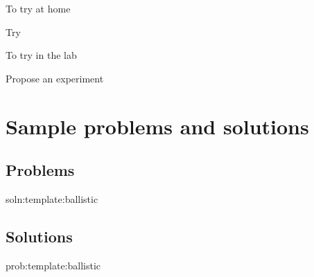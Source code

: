 \begin{chapteractivity}{To try at home}
{
\item Try
}
\end{chapteractivity}

\begin{chapteractivity}{To try in the lab}
{
\item Propose an experiment
}
\end{chapteractivity}

\newpage
\section{Sample problems and solutions}
\subsection{Problems}
\begin{problem}{soln:template:ballistic}{\label{prob:template:ballistic} 

}
\end{problem}

\newpage
\subsection{Solutions}
\begin{solution}{prob:template:ballistic}\label{soln:template:ballistic}

\end{solution}

